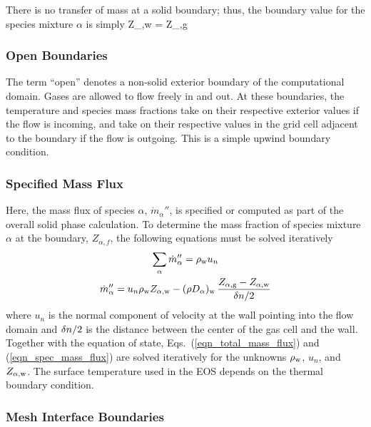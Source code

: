 There is no transfer of mass at a solid boundary; thus, the boundary value for the species mixture $\alpha$ is simply
\be Z_{\rm \alpha,w} = Z_{\rm \alpha,g} \ee

\subsubsection{Open Boundaries}

The term ``open'' denotes a non-solid exterior boundary of the computational domain. Gases are allowed to flow freely in and out. At these boundaries, the temperature and species mass fractions take on their respective exterior values if the flow is incoming, and take on their respective values in the grid cell adjacent to the boundary if the flow is outgoing. This is a simple upwind boundary condition.



\subsubsection{Specified Mass Flux}

Here, the mass flux of species $\alpha$, $\dot{m}_\alpha''$, is specified or computed as part of the overall solid phase calculation. To determine the mass fraction of species mixture $\alpha$ at the boundary, $Z_{\alpha,f}$, the following equations must be solved iteratively
\begin{gather}
\label{eqn_total_mass_flux} \sum_\alpha \dot{m}_\alpha'' = \rho_{\rm w} u_n \\
\label{eqn_spec_mass_flux}  \dot{m}_\alpha'' = u_n \rho_{\rm w} Z_{\rm \alpha,w} - (\rho D_\alpha)_{\rm w} \, \frac{Z_{\rm \alpha,g}-Z_{\rm \alpha,w}}{\delta n/2}
\end{gather}
where $u_n$ is the normal component of velocity at the wall pointing into the flow domain and $\delta n/2$ is the distance between the center of the gas cell and the wall. Together with the equation of state, Eqs.~(\ref{eqn_total_mass_flux}) and (\ref{eqn_spec_mass_flux}) are solved iteratively for the unknowns $\rho_{\rm w}$, $u_n$, and $Z_{\rm \alpha,w}$.  The surface temperature used in the EOS depends on the thermal boundary condition.


\subsubsection{Mesh Interface Boundaries}

